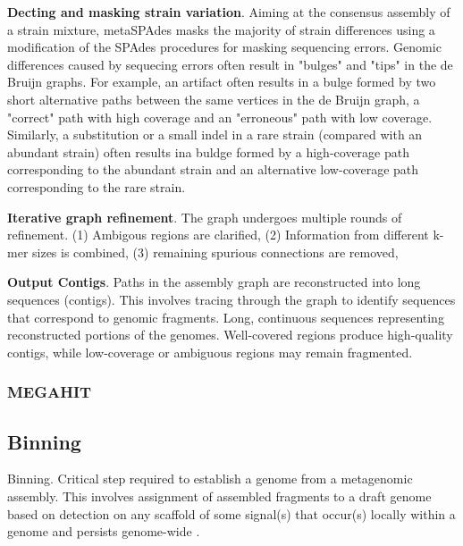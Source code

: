 \textbf{Decting and masking strain variation}. Aiming at the consensus assembly of a strain mixture, metaSPAdes masks the 
majority of strain differences using a modification of the SPAdes procedures for masking sequencing errors. Genomic differences 
caused by sequecing errors often result in "bulges" and "tips" in the de Bruijn graphs. For example, an artifact often 
results in a bulge formed by two short alternative paths between the same vertices in the de Bruijn graph, a "correct" 
path with high coverage and an "erroneous" path with low coverage. Similarly, a substitution or a small indel in a rare 
strain (compared with an abundant strain) often results ina buldge formed by a high-coverage path corresponding to the 
abundant strain and an alternative low-coverage path corresponding to the rare strain.

\textbf{Iterative graph refinement}. The graph undergoes multiple rounds of refinement. (1) Ambigous regions are clarified,
(2) Information from different k-mer sizes is combined, (3) remaining spurious connections are removed,

\textbf{Output Contigs}. Paths in the assembly graph are reconstructed into long sequences (contigs). This involves tracing 
through the graph to identify sequences that correspond to genomic fragments. Long, continuous sequences representing reconstructed 
portions of the genomes. Well-covered regions produce high-quality contigs, while low-coverage or ambiguous regions may 
remain fragmented.

\subsubsection{MEGAHIT}


\subsection{Binning}
Binning. Critical step required to establish a genome from a metagenomic assembly. This involves assignment of assembled 
fragments to a draft genome based on detection on any scaffold of some signal(s) that occur(s) locally within a genome and 
persists genome-wide \cite{Chen2020}. 

